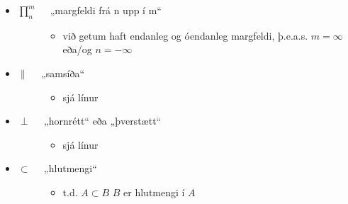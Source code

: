 \documentclass[a4paper,10pt,icelandic]{sphinxmanual}
\begin{document}
\begin{itemize}
\begin{description}
\begin{itemize}
\end{itemize}

\end{description}

\item {} \begin{description}
\item[{\(\prod_{n}^{m} \quad\) „margfeldi frá n upp í m“}] \leavevmode\begin{itemize}
\item {} 
við getum haft endanleg og óendanleg margfeldi, þ.e.a.s. \(m= \infty\) eða/og  \(n= -\infty\)

\end{itemize}

\end{description}

\item {} \begin{description}
\item[{\(\parallel \quad\) „samsíða“}] \leavevmode\begin{itemize}
\item {} 
sjá {\hyperref[\detokenize{Kafli03:s-samsia}]{}} línur

\end{itemize}

\end{description}

\item {} \begin{description}
\item[{\(\perp  \quad\) „hornrétt“ eða „þverstætt“}] \leavevmode\begin{itemize}
\item {} 
sjá {\hyperref[\detokenize{Kafli03:s-verstae}]{}} línur

\end{itemize}

\end{description}

\item {} \begin{description}
\item[{\(\subset \quad\) „hlutmengi“}] \leavevmode\begin{itemize}
\item {} 
t.d. \(A \subset B\)  \(B\) er hlutmengi í \(A\)

\end{itemize}


\end{description}
\end{itemize}
\end{document}

